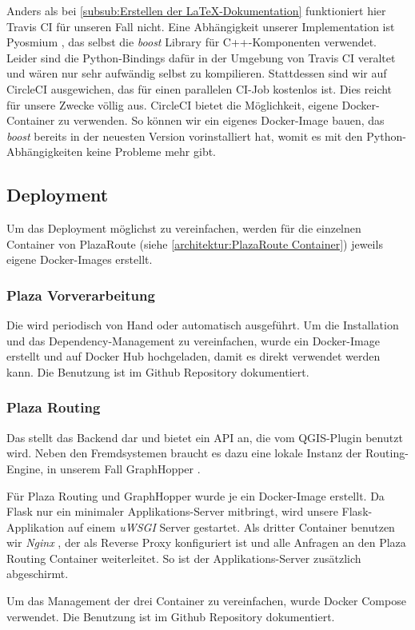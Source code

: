 Anders als bei \ref{subsub:Erstellen der LaTeX-Dokumentation} funktioniert hier Travis CI für unseren Fall nicht. Eine Abhängigkeit unserer Implementation ist Pyosmium \cite{pyosmium}, das selbst die \emph{boost} Library für C++-Komponenten verwendet. Leider sind die Python-Bindings dafür in der Umgebung von Travis CI veraltet und wären nur sehr aufwändig selbst zu kompilieren. Stattdessen sind wir auf CircleCI \cite{circleci} ausgewichen, das für einen parallelen \ac{CI}-Job kostenlos ist. Dies reicht für unsere Zwecke völlig aus. CircleCI bietet die Möglichkeit, eigene Docker-Container zu verwenden. So können wir ein eigenes Docker-Image bauen, das \emph{boost} bereits in der neuesten Version vorinstalliert hat, womit es mit den Python-Abhängigkeiten keine Probleme mehr gibt.

\subsection{Deployment}
\label{sub:Deployment}

Um das Deployment möglichst zu vereinfachen, werden für die einzelnen Container von PlazaRoute (siehe \ref{architektur:PlazaRoute Container}) jeweils eigene Docker-Images erstellt.

\subsubsection{Plaza Vorverarbeitung}
\label{deployment:Plaza Vorverarbeitung}

Die  wird periodisch von Hand oder automatisch ausgeführt. Um die Installation und das Dependency-Management zu vereinfachen, wurde ein Docker-Image erstellt und auf Docker Hub \cite{dockerhub:plazaroute} hochgeladen, damit es direkt verwendet werden kann. Die Benutzung ist im Github Repository \cite{github:PlazaRoute} dokumentiert.

\subsubsection{Plaza Routing}
\label{deployment:Plaza Routing}

Das  stellt das Backend dar und bietet ein API an, die vom QGIS-Plugin benutzt wird. Neben den Fremdsystemen braucht es dazu eine lokale Instanz der \gls{Routing-Engine}, in unserem Fall GraphHopper \cite{graphhopper}.

Für Plaza Routing und GraphHopper wurde je ein Docker-Image erstellt. Da Flask \cite{flask} nur ein minimaler Applikations-Server mitbringt, wird unsere Flask-Applikation auf einem \emph{uWSGI} \cite{uwsgi} Server gestartet. Als dritter Container benutzen wir \emph{Nginx} \cite{nginx}, der als Reverse Proxy konfiguriert ist und alle Anfragen an den Plaza Routing Container weiterleitet. So ist der Applikations-Server zusätzlich abgeschirmt.

Um das Management der drei Container zu vereinfachen, wurde Docker Compose \cite{docker-compose} verwendet. Die Benutzung ist im Github Repository \cite{github:PlazaRoute} dokumentiert.